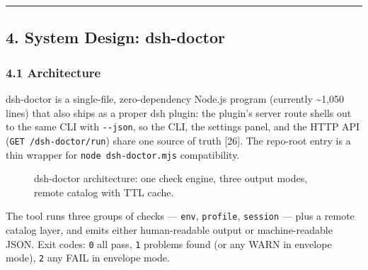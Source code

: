 \documentclass[
]{article}
\begin{document}
\begin{center}\rule{0.5\linewidth}{0.5pt}\end{center}

\subsection{4. System Design:
dsh-doctor}\label{system-design-dsh-doctor}

\subsubsection{4.1 Architecture}\label{architecture}

dsh-doctor is a single-file, zero-dependency Node.js program (currently
\textasciitilde1,050 lines) that also ships as a proper dsh plugin: the
plugin's server route shells out to the same CLI with \texttt{-\/-json},
so the CLI, the settings panel, and the HTTP API
(\texttt{GET\ /dsh-doctor/run}) share one source of truth {[}26{]}. The
repo-root entry is a thin wrapper for \texttt{node\ dsh-doctor.mjs}
compatibility.

\begin{figure}[H]
\centering
{}
\caption{dsh-doctor architecture: one check engine, three output modes, remote catalog with TTL cache.}
\label{fig:arch}
\end{figure}


The tool runs three groups of checks --- \texttt{env}, \texttt{profile},
\texttt{session} --- plus a remote catalog layer, and emits either
human-readable output or machine-readable JSON. Exit codes: \texttt{0}
all pass, \texttt{1} problems found (or any WARN in envelope mode),
\texttt{2} any FAIL in envelope mode.
\end{document}
